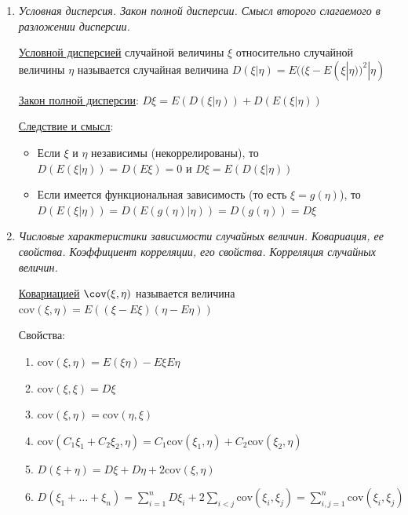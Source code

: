 \documentclass[12pt]{article}
\begin{document}
\begin{enumerate}
    \item \textit{Условная дисперсия. Закон полной дисперсии. Смысл второго слагаемого в разложении дисперсии.}

    \hyperlink{conditionalvariance}{Условной дисперсией} случайной величины $\xi$ относительно случайной величины $\eta$ называется случайная величина 
    $D(\xi | \eta) = E((\xi - E(\xi | \eta))^2 | \eta)$
    
    \hyperlink{lawoffullvariance}{Закон полной дисперсии}: \Ths $D\xi = E(D(\xi | \eta)) + D(E(\xi | \eta))$

    \underline{Следствие и смысл}: 
    
    \begin{itemize}
        \item Если $\xi$ и $\eta$ независимы (некоррелированы), то $D(E(\xi | \eta)) = D(E\xi) = 0$ и $D\xi = E(D(\xi | \eta))$

        \item Если имеется функциональная зависимость (то есть $\xi = g(\eta)$), то $D(E(\xi | \eta)) = D(E(g(\eta) | \eta)) = 
        D(g(\eta)) = D\xi$
    \end{itemize}

    \item \textit{Числовые характеристики зависимости случайных величин. Ковариация, ее свойства. Коэффициент корреляции, его свойства. Корреляция случайных величин.}

    \hyperlink{covariance}{Ковариацией} $\mathrm{\cov}(\xi, \eta)$ называется величина $\mathrm{cov}(\xi, \eta) = E((\xi - E\xi)(\eta - E\eta))$

    Свойства:

    \begin{enumerate}
        \item $\mathrm{cov} (\xi, \eta) = E(\xi\eta) - E\xi E\eta$

        \item $\mathrm{cov} (\xi, \xi) = D\xi$

        \item $\mathrm{cov}(\xi, \eta) = \mathrm{cov}(\eta, \xi)$

        \item $\mathrm{cov}(C_1 \xi_1 + C_2 \xi_2, \eta) = C_1 \mathrm{cov}(\xi_1, \eta) + C_2 \mathrm{cov}(\xi_2, \eta)$

        \item $D(\xi + \eta) = D\xi + D\eta + 2\mathrm{cov}(\xi, \eta)$

        \item $D(\xi_1 + \dots + \xi_n) = \sum_{i = 1}^n D\xi_i + 2\sum_{i < j} \mathrm{cov}(\xi_i, \xi_j) = \sum_{i, j = 1}^{n} \mathrm{cov}(\xi_i, \xi_j)$


\end{enumerate}
\end{enumerate}
\end{document}
